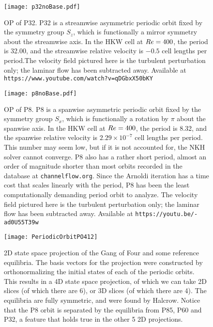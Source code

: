 \begin{figure}
\centerline{\texttt{[image: p32noBase.pdf]}}
\caption{OP of P32. P32 is a streamwise asymmetric periodic orbit fixed by the symmetry group $S_z$, which is functionally a mirror symmetry about the streamwise axis. In the HKW cell at $Re=400$, the period is 32.00, and the streamwise relative velocity is $-0.5$ cell lengths per period.The velocity field pictured here is the turbulent perturbation only; the laminar flow has been subtracted away. Available at {\tt https://www.youtube.com/watch?v=qDGbxX50bKY}}\label{fig:p32}
\end{figure}


\begin{figure}
\centerline{\texttt{[image: p8noBase.pdf]}}
\caption{OP of P8. P8 is a spanwise asymmetric periodic orbit fixed by the symmetry group $S_x$, which is functionally a rotation by $\pi$ about the spanwise axis. In the HKW cell at $Re = 400$, the period is 8.32, and the spanwise relative velocity is $2.29\times 10^{-7}$ cell lengths per period. This number may seem low, but if it is not accounted for, the NKH solver cannot converge. P8 also has a rather short period, almost an order of magnitude shorter than most orbits recorded in the database at {\tt channelflow.org}. Since the Arnoldi iteration has a time cost that scales linearly with the period, P8 has been the least computationally demanding period orbit to analyze. The velocity field pictured here is the turbulent perturbation only; the laminar flow has been subtracted away. Available at {\tt https://youtu.be/-ad0U55T39w}}\label{fig:p8}
\end{figure}



\begin{figure}[h]
\texttt{[image: PeriodicOrbitPO412]}
\caption{2D state space projection of the Gang of Four and some reference equilibria. The basis vectors for the projection were constructed by orthonormalizing the initial states of each of the periodic orbits. This results in a 4D state space projection, of which we can take 2D slices (of which there are 6), or 3D slices (of which there are 4). The equilibria are fully symmetric, and were found by Halcrow. Notice that the P8 orbit is separated by the equilibria from P85, P60 and P32, a feature that holds true in the other 5 2D projections.}\label{fig:POStateSpace}
\end{figure}

